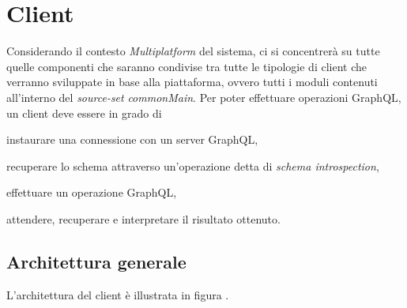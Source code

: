 \section{Client}\label{sec:client}
Considerando il contesto \textit{Multiplatform} del sistema, ci si concentrerà su tutte quelle componenti che saranno condivise tra tutte le tipologie
di client che verranno sviluppate in base alla piattaforma, ovvero tutti i moduli contenuti all'interno del \textit{source-set} \textit{commonMain}.
Per poter effettuare operazioni GraphQL, un client deve essere in grado di 
\begin{enumerate*}[label=(\roman*)]
    \item instaurare una connessione con un server GraphQL,
    \item recuperare lo schema attraverso un'operazione detta di \textit{schema introspection},
    \item effettuare un operazione GraphQL,
    \item attendere, recuperare e interpretare il risultato ottenuto.
\end{enumerate*}

\subsection{Architettura generale}\label{ssec:client-arch}
L'architettura del client è illustrata in figura . 


